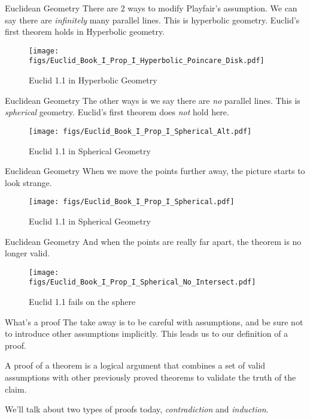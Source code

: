 \documentclass{beamer}
\begin{document}
    \begin{frame}{Euclidean Geometry}
        There are 2 ways to modify Playfair's assumption. We can say there are
        \textit{infinitely} many parallel lines. This is hyperbolic geometry.
        Euclid's first theorem holds in Hyperbolic geometry.
        \begin{figure}
            \centering
            \texttt{[image: figs/Euclid\_Book\_I\_Prop\_I\_Hyperbolic\_Poincare\_Disk.pdf]}
            \caption{Euclid 1.1 in Hyperbolic Geometry}
            \label{fig:Euclid_Book_I_Prop_I_Hyperbolic_Poincare_Disk}
        \end{figure}
    \end{frame}
    \begin{frame}{Euclidean Geometry}
        The other ways is we say there are \textit{no} parallel lines. This is
        \textit{spherical} geometry. Euclid's first theorem does \textit{not} hold here.
        \begin{figure}
            \centering
            \texttt{[image: figs/Euclid\_Book\_I\_Prop\_I\_Spherical\_Alt.pdf]}
            \caption{Euclid 1.1 in Spherical Geometry}
            \label{fig:Euclid_Book_I_Prop_I_Spherical_Alt}
        \end{figure}
    \end{frame}
    \begin{frame}{Euclidean Geometry}
        When we move the points further away, the picture starts to look strange.
        \begin{figure}
            \centering
            \texttt{[image: figs/Euclid\_Book\_I\_Prop\_I\_Spherical.pdf]}
            \caption{Euclid 1.1 in Spherical Geometry}
            \label{fig:Euclid_Book_I_Prop_I_Spherical}
        \end{figure}
    \end{frame}
    \begin{frame}{Euclidean Geometry}
        And when the points are really far apart, the theorem is no longer valid.
        \begin{figure}
            \centering
            \texttt{[image: figs/Euclid\_Book\_I\_Prop\_I\_Spherical\_No\_Intersect.pdf]}
            \caption{Euclid 1.1 fails on the sphere}
            \label{fig:Euclid_Book_I_Prop_I_Spherical_No_Intersect}
        \end{figure}
    \end{frame}
    \begin{frame}{What's a proof}
        The take away is to be careful with assumptions, and be sure not to introduce
        other assumptions implicitly. This leads us to our definition of a proof.
        \begin{definition}[Proof]
            A proof of a theorem is a logical argument that combines a set of valid assumptions
            with other previously proved theorems to validate the truth of the claim.
        \end{definition}
        We'll talk about two types of proofs today, \textit{contradiction} and \textit{induction}.
    \end{frame}
\end{document}
